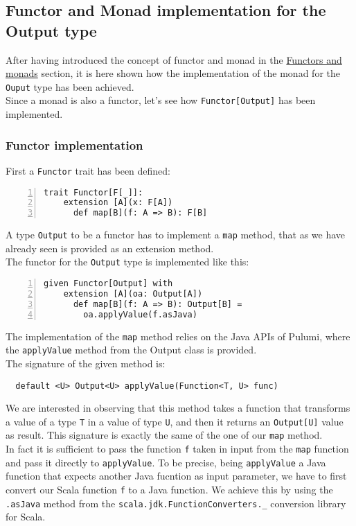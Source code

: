 \subsection{Functor and Monad implementation for the Output type}
After having introduced the concept of functor and monad in the \hyperref[sssec:functors-monads]{Functors and monads} section, it is here shown how the implementation of the monad for the \texttt{Ouput} type has been achieved.\\
Since a monad is also a functor, let's see how \texttt{Functor[Output]} has been implemented.

\subsubsection{Functor implementation}
First a \texttt{Functor} trait has been defined:\\
\begin{minipage}{\linewidth}
\begin{lstlisting}[numbers=left, numberstyle=\tiny, numbersep=-5pt, stepnumber=1, linewidth=420pt]
  trait Functor[F[_]]:
    extension [A](x: F[A])
      def map[B](f: A => B): F[B]
\end{lstlisting}
\end{minipage}
A type \texttt{Output} to be a functor has to implement a \texttt{map} method, that as we have already seen is provided as an extension method.\\
The functor for the \texttt{Output} type is implemented like this:\\
\begin{minipage}{\linewidth}
\begin{lstlisting}[numbers=left, numberstyle=\tiny, numbersep=-5pt, stepnumber=1, linewidth=420pt]
  given Functor[Output] with
    extension [A](oa: Output[A])
      def map[B](f: A => B): Output[B] =
        oa.applyValue(f.asJava)
\end{lstlisting}
\end{minipage}
The implementation of the \texttt{map} method relies on the Java APIs of Pulumi, where the \texttt{applyValue} method from the Output class is provided.\\
The signature of the given method is:
\begin{verbatim}
  default <U> Output<U> applyValue(Function<T, U> func)
\end{verbatim}
We are interested in observing that this method takes a function that transforms a value of a type \texttt{T} in a value of type \texttt{U}, and then it returns an \texttt{Output[U]} value as result.
This signature is exactly the same of the one of our \texttt{map} method.\\
In fact it is sufficient to pass the function \texttt{f} taken in input from the \texttt{map} function and pass it directly to \texttt{applyValue}.
To be precise, being \texttt{applyValue} a Java function that expects another Java fucntion as input parameter, we have to first convert our Scala function \texttt{f} to a Java function.
We achieve this by using the \texttt{.asJava} method from the \texttt{scala.jdk.FunctionConverters.\_} conversion library for Scala.

